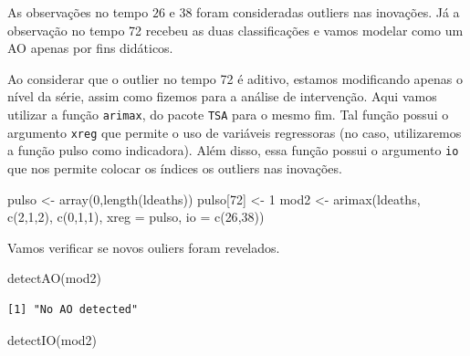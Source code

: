 \documentclass[
  letterpaper,
  DIV=11,
  numbers=noendperiod]{scrartcl}
\newenvironment{Shaded}{\begin{snugshade}}{\end{snugshade}}
\newcommand{\AttributeTok}[1]{\textcolor[rgb]{0.40,0.45,0.13}{#1}}
\newcommand{\DecValTok}[1]{\textcolor[rgb]{0.68,0.00,0.00}{#1}}
\newcommand{\FunctionTok}[1]{\textcolor[rgb]{0.28,0.35,0.67}{#1}}
\newcommand{\NormalTok}[1]{\textcolor[rgb]{0.00,0.23,0.31}{#1}}
\newcommand{\OtherTok}[1]{\textcolor[rgb]{0.00,0.23,0.31}{#1}}
\theoremstyle{plain}
\theoremstyle{plain}
\theoremstyle{definition}
\theoremstyle{definition}
\theoremstyle{remark}
\begin{document}
As observações no tempo \(26\) e 38 foram consideradas outliers nas
inovações. Já a observação no tempo 72 recebeu as duas classificações e
vamos modelar como um AO apenas por fins didáticos.

Ao considerar que o outlier no tempo 72 é aditivo, estamos modificando
apenas o nível da série, assim como fizemos para a análise de
intervenção. Aqui vamos utilizar a função \texttt{arimax}, do pacote
\texttt{TSA} para o mesmo fim. Tal função possui o argumento
\texttt{xreg} que permite o uso de variáveis regressoras (no caso,
utilizaremos a função pulso como indicadora). Além disso, essa função
possui o argumento \texttt{io} que nos permite colocar os índices os
outliers nas inovações.

\begin{Shaded}
\begin{Highlighting}[]
\NormalTok{pulso }\OtherTok{\textless{}{-}} \FunctionTok{array}\NormalTok{(}\DecValTok{0}\NormalTok{,}\FunctionTok{length}\NormalTok{(ldeaths))}
\NormalTok{pulso[}\DecValTok{72}\NormalTok{] }\OtherTok{\textless{}{-}} \DecValTok{1}
\NormalTok{mod2 }\OtherTok{\textless{}{-}} \FunctionTok{arimax}\NormalTok{(ldeaths, }\FunctionTok{c}\NormalTok{(}\DecValTok{2}\NormalTok{,}\DecValTok{1}\NormalTok{,}\DecValTok{2}\NormalTok{), }\FunctionTok{c}\NormalTok{(}\DecValTok{0}\NormalTok{,}\DecValTok{1}\NormalTok{,}\DecValTok{1}\NormalTok{), }\AttributeTok{xreg =}\NormalTok{ pulso, }\AttributeTok{io =} \FunctionTok{c}\NormalTok{(}\DecValTok{26}\NormalTok{,}\DecValTok{38}\NormalTok{))}
\end{Highlighting}
\end{Shaded}

Vamos verificar se novos ouliers foram revelados.

\begin{Shaded}
\begin{Highlighting}[]
\FunctionTok{detectAO}\NormalTok{(mod2)}
\end{Highlighting}
\end{Shaded}

\begin{verbatim}
[1] "No AO detected"
\end{verbatim}

\begin{Shaded}
\begin{Highlighting}[]
\FunctionTok{detectIO}\NormalTok{(mod2)}
\end{Highlighting}
\end{Shaded}
\end{document}
